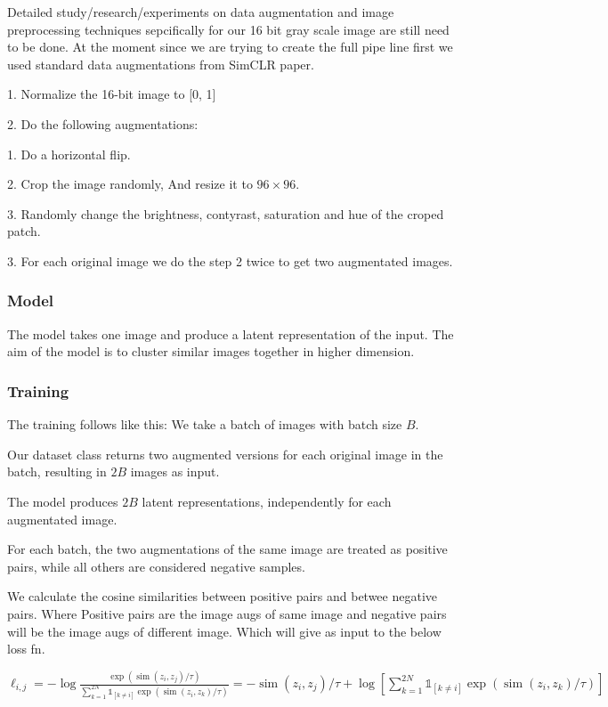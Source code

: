 \documentclass[12pt,twoside,a4paper,parskip]{scrbook} %
\begin{document}
Detailed study/research/experiments on data augmentation and image preprocessing techniques sepcifically for our 16 bit gray scale image are still need to be done.
At the moment since we are trying to create the full pipe line first we used standard data augmentations from SimCLR paper.

1. Normalize the 16-bit image to [0, 1]

2. Do the following augmentations:

      1. Do a horizontal flip.

      2. Crop the image randomly, And resize it to $96\times 96$.

      3. Randomly change the brightness, contyrast, saturation and hue of the croped patch.

3. For each original image we do the step 2 twice to get two augmentated images.

\subsubsection{Model}
The model takes one image and produce a latent representation of the input. The aim of the model is to cluster similar images together in higher dimension.
\subsubsection{Training}
The training follows like this:
  We take a batch of images with batch size $B$.

  Our dataset class returns two augmented versions for each original image in the batch, resulting in $2B$ images as input.

  The model produces $2B$ latent representations, independently for each augmentated image.

  For each batch, the two augmentations of the same image are treated as positive pairs, while all others are considered negative samples.

  We calculate the cosine similarities between positive pairs and betwee  negative pairs. Where Positive pairs are the image augs of same image and negative pairs will be the image augs of different image. Which will give as input to the below loss fn. 

\( \ell_{i, j}=-\log \frac{\exp \left(\operatorname{sim}\left(z_{i}, z_{j}\right) / \tau\right)}{\sum_{k=1}^{2 N} \mathbb{1}_{[k \neq i]} \exp \left(\operatorname{sim}\left(z_{i}, z_{k}\right) / \tau\right)}=-\operatorname{sim}\left(z_{i}, z_{j}\right) / \tau+\log \left[\sum_{k=1}^{2 N} \mathbb{1}_{[k \neq i]} \exp \left(\operatorname{sim}\left(z_{i}, z_{k}\right) / \tau\right)\right] \)
\end{document}
